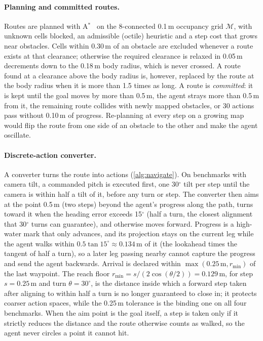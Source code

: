 \documentclass[10pt]{article}
\newcommand{\M}{\mathcal{M}}
\begin{document}
\paragraph{Planning and committed routes.}
Routes are planned with A$^*$~\citep{hart1968formal} on the 8-connected 0.1\,m occupancy grid $\M$, with unknown cells
blocked, an admissible (octile) heuristic and a step cost that grows near obstacles. Cells within 0.30\,m of an
obstacle are excluded whenever a route exists at that clearance; otherwise the required clearance is relaxed in
0.05\,m decrements down to the 0.18\,m body radius, which is never crossed. A route found at a clearance above the
body radius is, however, replaced by the route at the body radius when it is more than 1.5 times as long. A route is
\emph{committed}: it is kept
until the goal moves by more than 0.5\,m, the agent strays more than 0.5\,m from it, the remaining route collides with
newly mapped obstacles, or 30 actions pass without 0.10\,m of progress. Re-planning at every step on a growing map
would flip the route from one side of an obstacle to the other and make the agent oscillate.

\paragraph{Discrete-action converter.}
A converter turns the route into actions (\cref{alg:navigate}). On benchmarks with camera tilt, a commanded pitch is
executed first, one 30$^\circ$ tilt per step until the camera is within half a tilt of it, before any turn or step.
The converter then aims at the point 0.5\,m (two steps) beyond the agent's progress along the path, turns toward it
when the heading error exceeds 15$^\circ$ (half a turn, the closest alignment that 30$^\circ$ turns can guarantee),
and otherwise moves forward. Progress is a high-water mark that only advances, and its projection stays on the current
leg while the agent walks within $0.5\tan 15^\circ \approx 0.134$\,m of it (the lookahead times the tangent of half a
turn), so a later leg passing nearby cannot capture the progress and send the agent backwards. Arrival is declared
within $\max(0.25\,\mathrm{m}, r_{\min})$ of the last waypoint. The reach floor $r_{\min} = s/(2\cos(\theta/2)) =
0.129$\,m, for step $s = 0.25$\,m and turn $\theta = 30^\circ$, is the distance inside which a forward step taken
after aligning to within half a turn is no longer guaranteed to close in; it protects coarser action spaces, while the
0.25\,m tolerance is the binding one on all four benchmarks. When the aim point is the goal itself, a step is taken
only if it strictly reduces the distance and the route otherwise counts as walked, so the agent never circles a point
it cannot hit.
\end{document}
